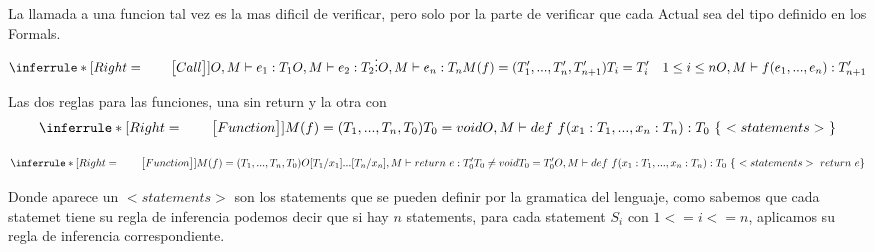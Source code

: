 \documentclass[12pt]{report}
\begin{document}
La llamada a una funcion tal vez es la mas dificil de verificar, pero solo por la parte de verificar que cada Actual sea del tipo definido en los Formals.
$$\inferrule* [Right=\quad\quad\big [Call\big{]}]{
O,M \vdash e_1 : T_1\\\\
O,M \vdash e_2 : T_2\\\\
\vdots \\\\
O,M \vdash e_n : T_n \\\\
M(f) = (T'_1,...,T'_n,T'_{n+1})\\\\
T_i = T'_i \quad 1 \leq i \leq n
}{O,M \vdash f(e_1,...,e_n) : T'_{n + 1}}$$

Las dos reglas para las funciones, una sin return y la otra con
$$\inferrule* [Right=\quad\quad\big [Function\big{]}]{
M(f) = (T_1,...,T_n,T_0)\\\\
T_0 = void
}{O,M \vdash def\  f(x_1:T_1,...,x_n:T_n):T_0\  \{\  <statements>\  \}}$$

$$\inferrule* [Right=\quad\quad\big [Function\big{]}]{
M(f) = (T_1,...,T_n,T_0)\\\\
O[T_1/x_1]...[T_n/x_n],M \vdash return\  e:T'_0 \\\\
T_0 \neq void \\\\
T_0 = T'_0
}{O,M \vdash def\  f(x_1:T_1,...,x_n:T_n):T_0\  \{\  <statements>\  return\  e\}}$$

Donde aparece un $<statements>$ son los statements que se pueden definir por la gramatica del lenguaje, como sabemos que cada statemet tiene su regla de inferencia podemos decir que si hay $n$ statements, para cada statement $S_i$ con $1 <= i <= n$, aplicamos su regla de inferencia correspondiente.
\end{document}
